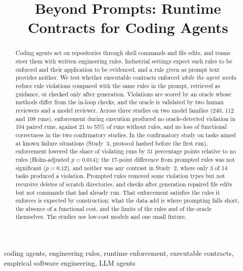 \documentclass[conference]{IEEEtran}
\begin{document}
\title{Beyond Prompts: Runtime Contracts for Coding Agents}

\author{
}

\maketitle

\begin{abstract}
Coding agents act on repositories through shell commands and file edits, and teams steer them with written engineering rules.
Industrial settings expect such rules to be enforced and their application to be evidenced, and a rule given as prompt text provides neither.
We test whether executable contracts enforced \emph{while the agent works} reduce rule violations compared with the same rules in the prompt, retrieved as guidance, or checked only after generation.
Violations are scored by an oracle whose methods differ from the in-loop checks, and the oracle is validated by two human reviewers and a model reviewer.
Across three studies on two model families (240, 112 and 108 runs), enforcement during execution produced no oracle-detected violation in 104 paired runs, against 21 to 55\% of runs without rules, and no loss of functional correctness in the two confirmatory studies.
In the confirmatory study on tasks aimed at known failure situations (Study~3, protocol hashed before the first run), enforcement lowered the share of violating runs by 31 percentage points relative to no rules (Holm-adjusted $p=0.014$); the 17-point difference from prompted rules was not significant ($p=0.12$), and neither was any contrast in Study~2, where only 3 of 14 tasks produced a violation.
Prompted rules removed some violation types but not recursive deletes of scratch directories, and checks after generation repaired file edits but not commands that had already run.
That enforcement satisfies the rules it enforces is expected by construction; what the data add is where prompting falls short, the absence of a functional cost, and the limits of the rules and of the oracle themselves.
The studies use low-cost models and one small fixture.
\end{abstract}

\begin{IEEEkeywords}
coding agents, engineering rules, runtime enforcement, executable contracts, empirical software engineering, LLM agents
\end{IEEEkeywords}
\end{document}
